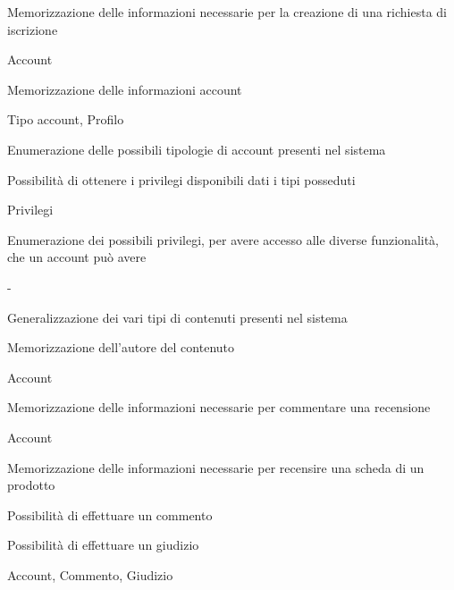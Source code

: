 
{\begin{itemWork}
	\item Memorizzazione delle informazioni necessarie per la creazione di una richiesta di iscrizione
\end{itemWork}}
{Account}


{\begin{itemWork}
	\item Memorizzazione delle informazioni account
\end{itemWork}}
{Tipo account, Profilo}


{\begin{itemWork}
	\item Enumerazione delle possibili tipologie di account presenti nel sistema
	\item Possibilità di ottenere i privilegi disponibili dati i tipi posseduti
\end{itemWork}}
{Privilegi}


{\begin{itemWork}
	\item Enumerazione dei possibili privilegi, per avere accesso alle diverse funzionalità, che un account può avere
\end{itemWork}}
{-}


{\begin{itemWork}
	\item Generalizzazione dei vari tipi di contenuti presenti nel sistema
	\item Memorizzazione dell'autore del contenuto
\end{itemWork}}
{Account}


{\begin{itemWork}
	\item Memorizzazione delle informazioni necessarie per commentare una recensione
\end{itemWork}}
{Account}


{\begin{itemWork}
	\item Memorizzazione delle informazioni necessarie per recensire una scheda di un prodotto
	\item Possibilità di effettuare un commento
	\item Possibilità di effettuare un giudizio
\end{itemWork}}
{Account, Commento, Giudizio}

